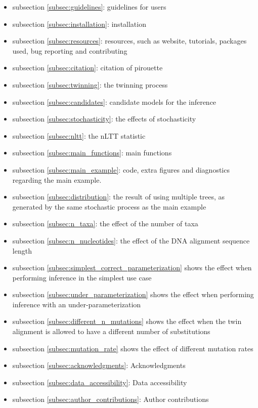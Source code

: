 \begin{itemize}
  \item{
    subsection \ref{subsec:guidelines}: guidelines for users
  }
  \item{
    subsection \ref{subsec:installation}: installation
  }
  \item{
    subsection \ref{subsec:resources}: resources, such as 
    website, tutorials, packages used, bug reporting and contributing
  }
  \item{
    subsection \ref{subsec:citation}: citation of pirouette
  }
  \item{
    subsection \ref{subsec:twinning}: the
    twinning process
  }
  \item{
    subsection \ref{subsec:candidates}: candidate models for the inference
  }
  \item{
    subsection \ref{subsec:stochasticity}: the effects of stochasticity
  }
  \item{
    subsection \ref{subsec:nltt}: the
    nLTT statistic
  }
  \item{
    subsection \ref{subsec:main_functions}: main functions
  }
  \item{
    subsection \ref{subsec:main_example}: code, extra figures and
    diagnostics regarding the main example.
  }
  \item{
    subsection \ref{subsec:distribution}: the result of using 
    multiple trees, as generated by the
    same stochastic process as the main example
  }
  \item{
    subsection \ref{subsec:n_taxa}: the effect of the number of taxa
  }
  \item{
    subsection \ref{subsec:n_nucleotides}: the effect of the DNA
    alignment sequence length
  }
  \item{
    subsection \ref{subsec:simplest_correct_parameterization} shows the
    effect when performing inference in the simplest use case
  }
  \item{
    subsection \ref{subsec:under_parameterization} shows the
    effect when performing inference with an under-parameterization
  }
  \item{
    subsection \ref{subsec:different_n_mutations} shows the
    effect when the twin alignment is allowed to have a different
    number of substitutions
  }
  \item{
    subsection \ref{subsec:mutation_rate} shows the
    effect of different mutation rates
  }
  \item{
    subsection \ref{subsec:acknowledgments}: Acknowledgments
  }
  \item{
    subsection \ref{subsec:data_accessibility}: Data accessibility
  }
  \item{
    subsection \ref{subsec:author_contributions}: Author contributions
  }
\end{itemize}


